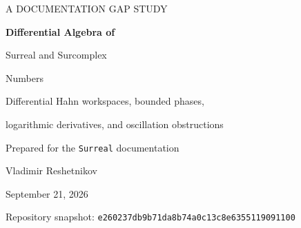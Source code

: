 \documentclass[11pt,a4paper]{article}
\theoremstyle{definition}
\newcommand{\No}{\mathbf{No}}
\newcommand{\SC}{\mathbf{No}[i]}
\newcommand{\D}{\partial}
\newcommand{\OO}{\mathcal O}
\newcommand{\dlog}{\operatorname{dlog}_{\D}}
\numberwithin{equation}{section}
\begin{document}
\hypersetup{pageanchor=false}
\begin{titlepage}
\centering
\vspace*{12mm}
{\small\sffamily\color{Muted}A DOCUMENTATION GAP STUDY\par}
\vspace{9mm}
{\Huge\bfseries\color{Ink}Differential Algebra of\par
Surreal and Surcomplex\par Numbers\par}
\vspace{7mm}
{\Large Differential Hahn workspaces, bounded phases,\par
logarithmic derivatives, and oscillation obstructions\par}
\vspace{10mm}
{\large Prepared for the \texttt{Surreal} documentation\par}
{\normalsize Vladimir Reshetnikov\par}
\vspace{4mm}
{\normalsize September 21, 2026\par}
\vspace{11mm}
\begin{minipage}{0.91\textwidth}
\begin{abstract}
The documentation of the \texttt{Surreal} repository develops an extensive
Hahn-supported theory of surcomplex functions, but deliberately separates
that theory from derivations of the scalar field. This article supplies a
bridge using the Berarducci--Mantova derivation $\D$, normalized by
$\D\omega=1$.

The first bridge is support-theoretic: every set of surcomplex numbers lies
in a set-sized, algebraically closed Hahn field stable under $\D$. A
countable closure of its exponent group constructs such a workspace, and
strong additivity carries the construction to common-domain analytic
coefficient families. The second bridge is differential-algebraic. Writing
$\OO$ for the finite real surreals, we prove the exact identity
\[
 \dlog(\SC^\times)=\No+i\D\OO.
\]
Consequently $\D y=(a+ib)y$ has a nonzero surcomplex solution exactly when
$b$ has a finite surreal primitive. An explicit, purely infinite phase
obstruction classifies all rank-one equations up to multiplicative gauge.
For rational $b(\omega)$ the criterion reduces to a degree comparison.
Constant-coefficient equations admit a complete solution-space description:
only their real characteristic roots contribute. In particular,
$\D^2y+y=0$ has no nonzero solution in $\SC$, despite algebraic closedness
and surjectivity of $\D$.

The deep existence theorem for $\D$ is imported with attribution; the
workspace construction, phase analysis, classifications, and coefficient
interfaces are proved here. An explicit Picard--Vessiot extension explains
where an oscillatory solution can live. Exact symbolic checks accompany the
exposition, but are not a formal verification or a claim of priority.
\end{abstract}
\end{minipage}
\vfill
{\small\color{Muted}Repository snapshot:
\texttt{e260237db9b71da8b74a0c13c8e6355119091100}\par}
\end{titlepage}
\end{document}

